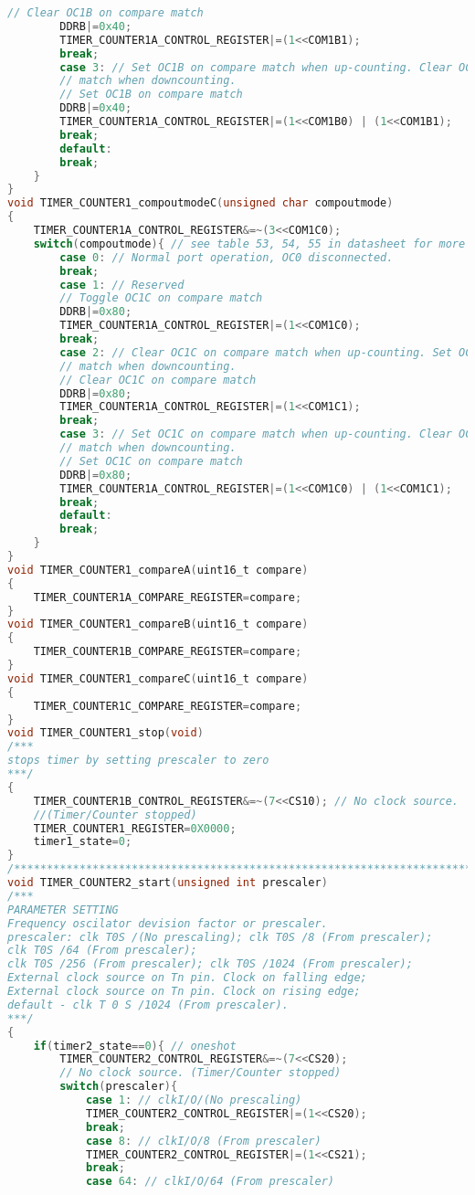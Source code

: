 \begin{lstlisting}[language=C, caption={atmega128timer.c}, label=atmega128timer-c, captionpos=b]
		// Clear OC1B on compare match
		DDRB|=0x40;
		TIMER_COUNTER1A_CONTROL_REGISTER|=(1<<COM1B1);
		break;
		case 3: // Set OC1B on compare match when up-counting. Clear OC0 on compare
		// match when downcounting.
		// Set OC1B on compare match
		DDRB|=0x40;
		TIMER_COUNTER1A_CONTROL_REGISTER|=(1<<COM1B0) | (1<<COM1B1);
		break;
		default:
		break;
	}
}
void TIMER_COUNTER1_compoutmodeC(unsigned char compoutmode)
{
	TIMER_COUNTER1A_CONTROL_REGISTER&=~(3<<COM1C0);
	switch(compoutmode){ // see table 53, 54, 55 in datasheet for more information
		case 0: // Normal port operation, OC0 disconnected.
		break;
		case 1: // Reserved
		// Toggle OC1C on compare match
		DDRB|=0x80;
		TIMER_COUNTER1A_CONTROL_REGISTER|=(1<<COM1C0);
		break;
		case 2: // Clear OC1C on compare match when up-counting. Set OC0 on compare
		// match when downcounting.
		// Clear OC1C on compare match
		DDRB|=0x80;
		TIMER_COUNTER1A_CONTROL_REGISTER|=(1<<COM1C1);
		break;
		case 3: // Set OC1C on compare match when up-counting. Clear OC0 on compare
		// match when downcounting.
		// Set OC1C on compare match
		DDRB|=0x80;
		TIMER_COUNTER1A_CONTROL_REGISTER|=(1<<COM1C0) | (1<<COM1C1);
		break;
		default:
		break;
	}
}
void TIMER_COUNTER1_compareA(uint16_t compare)
{
	TIMER_COUNTER1A_COMPARE_REGISTER=compare;
}
void TIMER_COUNTER1_compareB(uint16_t compare)
{
	TIMER_COUNTER1B_COMPARE_REGISTER=compare;
}
void TIMER_COUNTER1_compareC(uint16_t compare)
{
	TIMER_COUNTER1C_COMPARE_REGISTER=compare;
}
void TIMER_COUNTER1_stop(void)
/***
stops timer by setting prescaler to zero
***/
{
	TIMER_COUNTER1B_CONTROL_REGISTER&=~(7<<CS10); // No clock source.
	//(Timer/Counter stopped)
	TIMER_COUNTER1_REGISTER=0X0000;
	timer1_state=0;
}
/*****************************************************************************************/
void TIMER_COUNTER2_start(unsigned int prescaler)
/***
PARAMETER SETTING
Frequency oscilator devision factor or prescaler.
prescaler: clk T0S /(No prescaling); clk T0S /8 (From prescaler);
clk T0S /64 (From prescaler);
clk T0S /256 (From prescaler); clk T0S /1024 (From prescaler);
External clock source on Tn pin. Clock on falling edge;
External clock source on Tn pin. Clock on rising edge;
default - clk T 0 S /1024 (From prescaler).
***/
{
	if(timer2_state==0){ // oneshot
		TIMER_COUNTER2_CONTROL_REGISTER&=~(7<<CS20);
		// No clock source. (Timer/Counter stopped)
		switch(prescaler){
			case 1: // clkI/O/(No prescaling)
			TIMER_COUNTER2_CONTROL_REGISTER|=(1<<CS20);
			break;
			case 8: // clkI/O/8 (From prescaler)
			TIMER_COUNTER2_CONTROL_REGISTER|=(1<<CS21);
			break;
			case 64: // clkI/O/64 (From prescaler)

\end{lstlisting}
